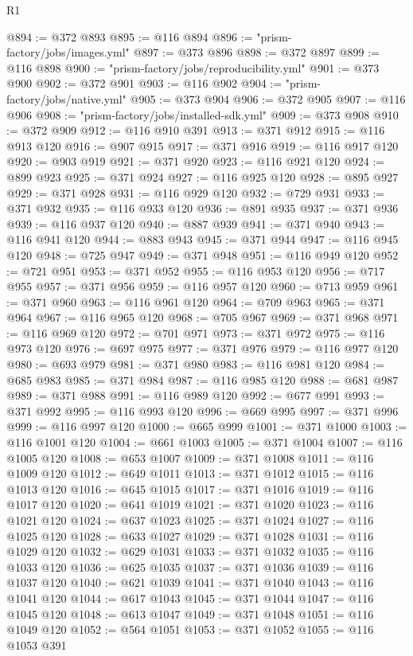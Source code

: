 \begin{lexlean}{R1}
\begin{coremodule}
@894 := @372 @893
@895 := @116 @894
@896 := "prism-factory/jobs/images.yml"
@897 := @373 @896
@898 := @372 @897
@899 := @116 @898
@900 := "prism-factory/jobs/reproducibility.yml"
@901 := @373 @900
@902 := @372 @901
@903 := @116 @902
@904 := "prism-factory/jobs/native.yml"
@905 := @373 @904
@906 := @372 @905
@907 := @116 @906
@908 := "prism-factory/jobs/installed-sdk.yml"
@909 := @373 @908
@910 := @372 @909
@912 := @116 @910 @391
@913 := @371 @912
@915 := @116 @913 @120
@916 := @907 @915
@917 := @371 @916
@919 := @116 @917 @120
@920 := @903 @919
@921 := @371 @920
@923 := @116 @921 @120
@924 := @899 @923
@925 := @371 @924
@927 := @116 @925 @120
@928 := @895 @927
@929 := @371 @928
@931 := @116 @929 @120
@932 := @729 @931
@933 := @371 @932
@935 := @116 @933 @120
@936 := @891 @935
@937 := @371 @936
@939 := @116 @937 @120
@940 := @887 @939
@941 := @371 @940
@943 := @116 @941 @120
@944 := @883 @943
@945 := @371 @944
@947 := @116 @945 @120
@948 := @725 @947
@949 := @371 @948
@951 := @116 @949 @120
@952 := @721 @951
@953 := @371 @952
@955 := @116 @953 @120
@956 := @717 @955
@957 := @371 @956
@959 := @116 @957 @120
@960 := @713 @959
@961 := @371 @960
@963 := @116 @961 @120
@964 := @709 @963
@965 := @371 @964
@967 := @116 @965 @120
@968 := @705 @967
@969 := @371 @968
@971 := @116 @969 @120
@972 := @701 @971
@973 := @371 @972
@975 := @116 @973 @120
@976 := @697 @975
@977 := @371 @976
@979 := @116 @977 @120
@980 := @693 @979
@981 := @371 @980
@983 := @116 @981 @120
@984 := @685 @983
@985 := @371 @984
@987 := @116 @985 @120
@988 := @681 @987
@989 := @371 @988
@991 := @116 @989 @120
@992 := @677 @991
@993 := @371 @992
@995 := @116 @993 @120
@996 := @669 @995
@997 := @371 @996
@999 := @116 @997 @120
@1000 := @665 @999
@1001 := @371 @1000
@1003 := @116 @1001 @120
@1004 := @661 @1003
@1005 := @371 @1004
@1007 := @116 @1005 @120
@1008 := @653 @1007
@1009 := @371 @1008
@1011 := @116 @1009 @120
@1012 := @649 @1011
@1013 := @371 @1012
@1015 := @116 @1013 @120
@1016 := @645 @1015
@1017 := @371 @1016
@1019 := @116 @1017 @120
@1020 := @641 @1019
@1021 := @371 @1020
@1023 := @116 @1021 @120
@1024 := @637 @1023
@1025 := @371 @1024
@1027 := @116 @1025 @120
@1028 := @633 @1027
@1029 := @371 @1028
@1031 := @116 @1029 @120
@1032 := @629 @1031
@1033 := @371 @1032
@1035 := @116 @1033 @120
@1036 := @625 @1035
@1037 := @371 @1036
@1039 := @116 @1037 @120
@1040 := @621 @1039
@1041 := @371 @1040
@1043 := @116 @1041 @120
@1044 := @617 @1043
@1045 := @371 @1044
@1047 := @116 @1045 @120
@1048 := @613 @1047
@1049 := @371 @1048
@1051 := @116 @1049 @120
@1052 := @564 @1051
@1053 := @371 @1052
@1055 := @116 @1053 @391

\end{coremodule}
\end{lexlean}
